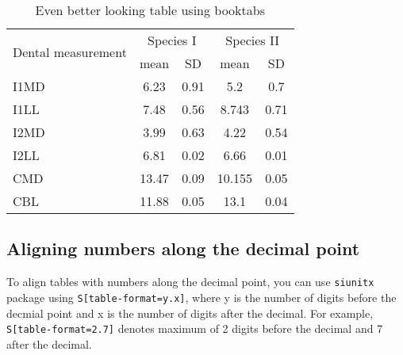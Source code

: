 \begin{table}
\caption{Even better looking table using booktabs}
\centering
\label{table:good_table}
\begin{tabular}{l c c c c}
\toprule
\multirow{2}{*}{Dental measurement} & \multicolumn{2}{c}{Species I} & \multicolumn{2}{c}{Species II} \\ 
\cmidrule{2-5}
  & mean & SD  & mean & SD  \\ 
\midrule
I1MD & 6.23 & 0.91 & 5.2  & 0.7  \\

I1LL & 7.48 & 0.56 & 8.743  & 0.71 \\

I2MD & 3.99 & 0.63 & 4.22 & 0.54 \\

I2LL & 6.81 & 0.02 & 6.66 & 0.01 \\

CMD & 13.47 & 0.09 & 10.155 & 0.05 \\

CBL & 11.88 & 0.05 & 13.1 & 0.04\\ 
\bottomrule
\end{tabular}
\end{table}

\subsection{Aligning numbers along the decimal point}
To align tables with numbers along the decimal point, you can use \verb+siunitx+
package using \verb+S[table-format=y.x]+, where y is the number of digits before
the decmial point and x is the number of digits after the decimal. For example, 
\verb+S[table-format=2.7]+ denotes maximum of 2 digits before the decimal and 7 
after the decimal.
